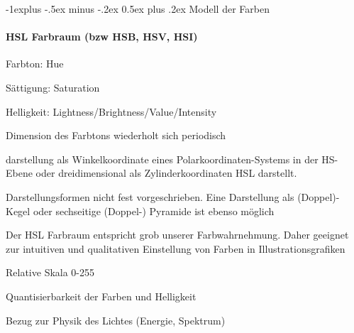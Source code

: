 \documentclass[landscape]{article}
\makeatletter
\renewcommand{\subsection}{\@startsection{subsection}{2}{0mm}%
                                {-1explus -.5ex minus -.2ex}%
                                {0.5ex plus .2ex}%
                                {\normalfont\normalsize\bfseries}}
\makeatother
\begin{document}
\begin{multicols}{3}
  \subsection{Modell der Farben}
  \paragraph{HSL Farbraum (bzw HSB, HSV, HSI)}
  \begin{itemize*}
    \item Farbton: Hue
    \item Sättigung: Saturation
    \item Helligkeit: Lightness/Brightness/Value/Intensity
    \item Dimension des Farbtons wiederholt sich periodisch
    \item darstellung als Winkelkoordinate eines Polarkoordinaten-Systems in der HS-Ebene oder dreidimensional als Zylinderkoordinaten HSL darstellt.
    \item Darstellungsformen nicht fest vorgeschrieben. Eine Darstellung als (Doppel)-Kegel oder sechseitige (Doppel-) Pyramide ist ebenso möglich
    \item Der HSL Farbraum entspricht grob unserer Farbwahrnehmung. Daher geeignet zur intuitiven und qualitativen Einstellung von Farben in Illustrationsgrafiken
    \item Relative Skala 0-255
    \item Quantisierbarkeit der Farben und Helligkeit
    \item Bezug zur Physik des Lichtes (Energie, Spektrum)
  \end{itemize*}


\end{multicols}
\end{document}
